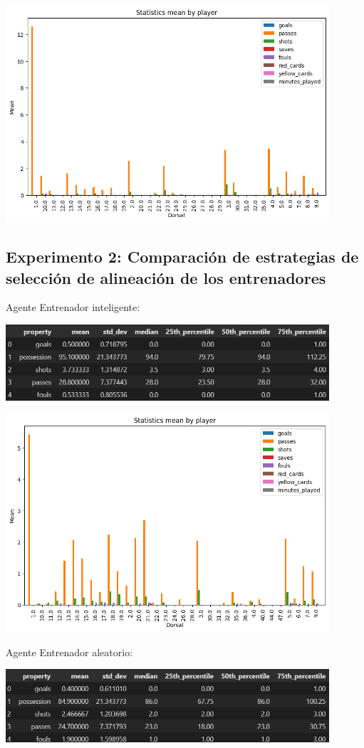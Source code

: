 \documentclass{article}
\begin{document}
\includegraphics[width=0.9\textwidth,height=0.5\textwidth]{images/smart_vs_random_player_away.png}                       

\subsection{Experimento 2: Comparación de estrategias de selección de alineación de los entrenadores}
Agente Entrenador inteligente:

\includegraphics[width=0.9\textwidth]{images/tabla3.PNG}

\includegraphics[width=0.9\textwidth,height=0.5\textwidth]{images/smart_vs_random_line_up_home.png}

Agente Entrenador aleatorio:

\includegraphics[width=0.9\textwidth]{images/tabla4.PNG}
\end{document}
